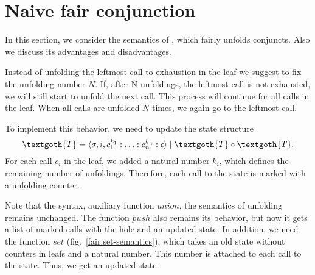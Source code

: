\section{Naive fair conjunction}

In this section, we consider the semantics of \mk, which fairly unfolds conjuncts. Also we discuss its advantages and disadvantages.

Instead of unfolding the leftmost call to exhaustion in the leaf we suggest to fix the unfolding number $N$.  If, after N unfoldings, the leftmost call is not exhausted, we will still start to unfold the next call. This process will continue for all calls in the leaf. When all calls are unfolded $N$ times, we again go to the leftmost call.

To implement this behavior, we need to update the state structure
\[
\textgoth{T} = \inbr{\sigma, i, c_1^{k_1} : \ldots : c_n^{k_n} : \epsilon} \mid \textgoth{T} \circ \textgoth{T}.
\]
For each call $c_i$ in the leaf, we added a natural number $k_i$, which defines the remaining number of unfoldings. Therefore, each call to the state is marked with a unfolding counter. 

Note that the syntax, auxiliary function $union$, the semantics of unfolding remains unchanged. The function $push$ also remains its behavior, but now it gets a list of marked calls with the hole and an updated state. In addition, we need the function $set$ (fig.~\ref{fair:set-semantics}), which takes an old state without counters in leafs and a natural number. This number is attached to each call to the state. Thus, we get an updated state. 

